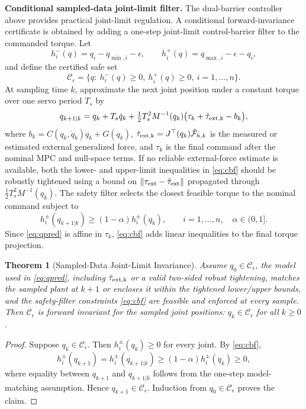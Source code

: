 \documentclass[journal]{IEEEtran}
\newtheorem{theorem}{Theorem}
\begin{document}
\textbf{Conditional sampled-data joint-limit filter.}
The dual-barrier controller above provides practical joint-limit regulation. A conditional
forward-invariance certificate is obtained by adding a one-step
joint-limit control-barrier filter to the commanded torque. Let
\begin{equation*}
  h_i^-(q)=q_i-q_{\min,i}-\epsilon,\qquad
  h_i^+(q)=q_{\max,i}-\epsilon-q_i ,
\end{equation*}
and define the certified safe set
\begin{equation*}
  \mathcal C_\epsilon=\{q:\ h_i^-(q)\ge0,\ h_i^+(q)\ge0,\ i=1,\ldots,n\}.
\end{equation*}
At sampling time $k$, approximate the next joint position under a
constant torque over one servo period $T_s$ by
\begin{equation}\label{eq:qpred}
  q_{k+1|k}=q_k+T_s\dot q_k+
  \tfrac12T_s^2 M^{-1}(q_k)\bigl(\tau_k+\hat\tau_{\rm ext,k}-b_k\bigr),
\end{equation}
where $b_k=C(q_k,\dot q_k)\dot q_k+G(q_k)$,
$\hat\tau_{\rm ext,k}=J^\top(q_k)\hat{\mathcal F}_{h,k}$ is the measured or
estimated external generalized force, and $\tau_k$ is the final command after
the nominal MPC and null-space terms. If no reliable external-force estimate
is available, both the lower- and upper-limit inequalities in \eqref{eq:cbf}
should be robustly tightened using a bound on
$\|\tau_{\rm ext}-\hat\tau_{\rm ext}\|$ propagated through
$\tfrac12T_s^2M^{-1}(q_k)$. The safety filter selects the closest feasible
torque to the nominal command subject to
\begin{equation}\label{eq:cbf}
  h_i^\pm(q_{k+1|k})\ge(1-\alpha)h_i^\pm(q_k),
  \qquad i=1,\ldots,n,\quad \alpha\in(0,1].
\end{equation}
Since \eqref{eq:qpred} is affine in $\tau_k$, \eqref{eq:cbf} adds
linear inequalities to the final torque projection.

\begin{theorem}[Sampled-Data Joint-Limit Invariance]\label{thm:invariance}
Assume $q_0\in\mathcal C_\epsilon$, the model used in
\eqref{eq:qpred}, including $\hat\tau_{\rm ext,k}$ or a valid two-sided robust
tightening, matches the sampled plant at $k{+}1$ or encloses it within the
tightened lower/upper bounds, and the safety-filter constraints \eqref{eq:cbf}
are feasible and enforced at every sample. Then $\mathcal C_\epsilon$ is
forward invariant for the sampled joint positions: $q_k\in\mathcal C_\epsilon$
for all $k\ge0$.
\end{theorem}
\begin{proof}
Suppose $q_k\in\mathcal C_\epsilon$. Then
$h_i^\pm(q_k)\ge0$ for every joint. By \eqref{eq:cbf},
\[
  h_i^\pm(q_{k+1})=h_i^\pm(q_{k+1|k})
  \ge (1-\alpha)h_i^\pm(q_k)\ge0,
\]
where equality between $q_{k+1}$ and $q_{k+1|k}$ follows from the
one-step model-matching assumption. Hence $q_{k+1}\in\mathcal C_\epsilon$.
Induction from $q_0\in\mathcal C_\epsilon$ proves the claim.
\end{proof}
\end{document}
